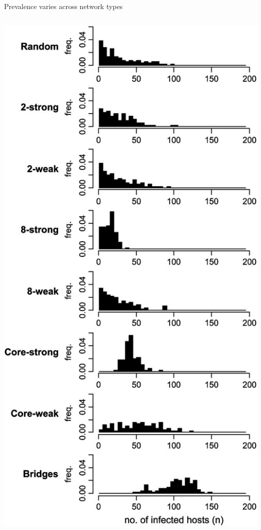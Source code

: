 \documentclass{beamer}
\begin{document}
\begin{frame}{Prevalence varies across network types}
\begin{columns}
\begin{column}{0.5\textwidth}
      \includegraphics[width=\textwidth, trim=0 0 0 22cm, clip]{F2}
    \end{column}
  \end{columns}
\end{frame}
\end{document}
